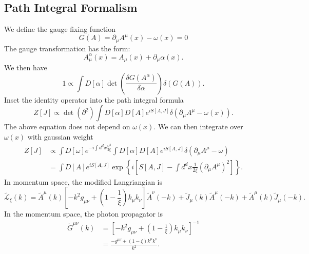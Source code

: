 \subsection{Path Integral Formalism}
We define the gauge fixing function
\begin{equation*}
	G(A) = \partial_\mu A^\mu(x) -\omega(x) = 0
\end{equation*}
The gauge transformation has the form:
\begin{equation*}
	A^\alpha_\mu(x) = A_\mu(x) + \partial_\mu \alpha(x).
\end{equation*}
We then have
\begin{equation*}
	1 \propto \int D[\alpha] \det\left(\frac{\delta G(A^\alpha)}{\delta \alpha}\right) \delta(G(A)).
\end{equation*}
Inset the identity operator into the path integral formula
\begin{equation*}
	Z[J] \propto \det\left(\partial^2 \right) \int D[\alpha]D[A] e^{iS[A,J]} \delta(\partial_\mu A^\mu -\omega(x)).
\end{equation*}
The above equation does not depend on $\omega(x)$.
We can then integrate over $\omega(x)$ with gaussian weight
\begin{equation*}
\begin{aligned}
	Z[J] &\propto \int D[\omega] e^{-i\int d^d x \frac{\omega^2}{2\xi}} \int D[\alpha]D[A] e^{iS[A,J]}
	\delta(\partial_\mu A^\mu-\omega) \\
	&= \int D[A] e^{iS[A,J]} \exp\left\{i \left[S[A,J]-\int d^d x \frac{1}{2\xi}(\partial_\mu A^\mu)^2 \right]\right\}.
\end{aligned}
\end{equation*}
In momentum space, the modified Langriangian is 
\begin{equation*}
	\tilde{\mathcal{L}}_\xi(k) = \tilde{A}^\mu(k)\left[
		-k^2 g_{\mu\nu}+\left(1-\frac{1}{\xi}\right)k_\mu k_\nu
		\right] \tilde{A}^\nu(-k) +
		\tilde{J}_\mu(k) \tilde{A}^\mu(-k) +
		\tilde{A}^\mu(k) \tilde{J}_\mu(-k).
\end{equation*}
In the momentum space, the photon propagator is
\begin{equation}\label{eq:qft-photon-momentum-propagator}
\begin{aligned}
	\tilde G^{\mu\nu}(k) 
	&= \left[-k^2 g_{\mu\nu}+\left(1-\frac{1}{\xi}\right)k_\mu k_\nu\right]^{-1} \\
	&= \frac{-g^{\mu\nu}+(1-\xi)k^\mu k^\nu}{k^2}.
\end{aligned}
\end{equation}
